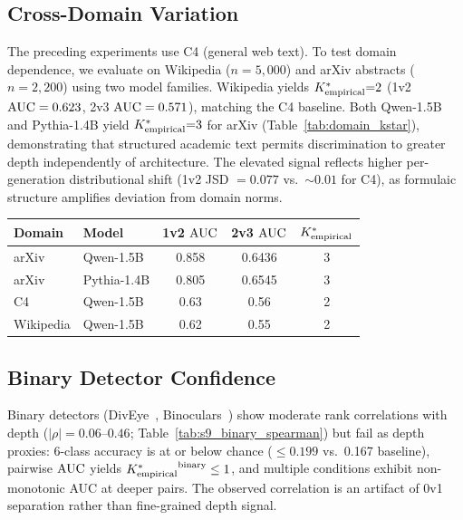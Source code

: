 \subsection{Cross-Domain Variation}
\label{sec:cross_domain}

The preceding experiments use C4 (general web text).
To test domain dependence, we evaluate on Wikipedia ($n{=}5{,}000$) and arXiv abstracts ($n{=}2{,}200$) using two model families.
Wikipedia yields ${K^*_{\text{empirical}}}{=}2$ (1v2 $\text{AUC} = 0.623$, 2v3 $\text{AUC} = 0.571$), matching the C4 baseline.
Both Qwen-1.5B and Pythia-1.4B yield ${K^*_{\text{empirical}}}{=}3$ for arXiv (Table~\ref{tab:domain_kstar}), demonstrating that structured academic text permits discrimination to greater depth independently of architecture.
The elevated signal reflects higher per-generation distributional shift (1v2 JSD $= 0.077$ vs.\ ${\sim}0.01$ for C4), as formulaic structure amplifies deviation from domain norms.

\begin{minipage}{\columnwidth}
\centering
\footnotesize
{}
\label{tab:domain_kstar}
\begin{tabular}{llccc}
\toprule
\textbf{Domain} & \textbf{Model} & \textbf{1v2 $\text{AUC}$} & \textbf{2v3 $\text{AUC}$} & ${K^*_{\text{empirical}}}$ \\
\midrule
arXiv & Qwen-1.5B  & 0.858 & 0.6436 & 3 \\
arXiv & Pythia-1.4B & 0.805 & 0.6545 & 3 \\
C4    & Qwen-1.5B  & 0.63  & 0.56   & 2 \\
Wikipedia & Qwen-1.5B & 0.62 & 0.55 & 2 \\
\bottomrule
\end{tabular}
\end{minipage}

\subsection{Binary Detector Confidence}
\label{sec:binary_confidence}

Binary detectors (DivEye~\cite{basani2026diveye}, Binoculars~\cite{hans2024binoculars}) show moderate rank correlations with depth ($|\rho| = 0.06$--$0.46$; Table~\ref{tab:s9_binary_spearman}) but fail as depth proxies: 6-class accuracy is at or below chance ($\leq 0.199$ vs.\ 0.167 baseline), pairwise $\text{AUC}$ yields ${K^*_{\text{empirical}}}^{\text{binary}} \leq 1$, and multiple conditions exhibit non-monotonic AUC at deeper pairs.
The observed correlation is an artifact of 0v1 separation rather than fine-grained depth signal.
